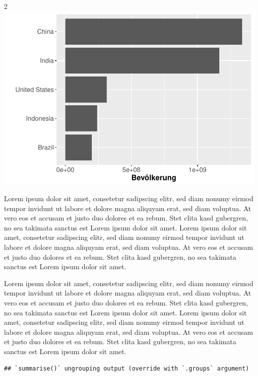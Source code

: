 \documentclass[
  a4paper,
  twoside]{article}
\begin{document}
\begin {multicols}{2}
\includegraphics[width=1\linewidth]{PDF_Latex_files/figure-latex/unnamed-chunk-5-1}

Lorem ipsum dolor sit amet, consetetur sadipscing elitr, sed diam nonumy eirmod tempor invidunt ut labore et dolore magna aliquyam erat, sed diam voluptua. At vero eos et accusam et justo duo dolores et ea rebum. Stet clita kasd gubergren, no sea takimata sanctus est Lorem ipsum dolor sit amet. Lorem ipsum dolor sit amet, consetetur sadipscing elitr, sed diam nonumy eirmod tempor invidunt ut labore et dolore magna aliquyam erat, sed diam voluptua. At vero eos et accusam et justo duo dolores et ea rebum. Stet clita kasd gubergren, no sea takimata sanctus est Lorem ipsum dolor sit amet.

\end {multicols}

Lorem ipsum dolor sit amet, consetetur sadipscing elitr, sed diam nonumy eirmod tempor invidunt ut labore et dolore magna aliquyam erat, sed diam voluptua. At vero eos et accusam et justo duo dolores et ea rebum. Stet clita kasd gubergren, no sea takimata sanctus est Lorem ipsum dolor sit amet. Lorem ipsum dolor sit amet, consetetur sadipscing elitr, sed diam nonumy eirmod tempor invidunt ut labore et dolore magna aliquyam erat, sed diam voluptua. At vero eos et accusam et justo duo dolores et ea rebum. Stet clita kasd gubergren, no sea takimata sanctus est Lorem ipsum dolor sit amet.

\begin{verbatim}
## `summarise()` ungrouping output (override with `.groups` argument)
\end{verbatim}
\end{document}
